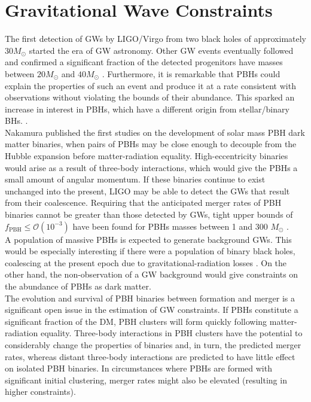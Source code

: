 \section{Gravitational Wave Constraints}
The first detection of GWs by LIGO/Virgo from two black holes of approximately $30 M_{\odot}$ started the era of GW astronomy. Other GW events eventually followed and confirmed a significant fraction of the detected progenitors have masses between $20 M_{\odot}$ and  $40 M_{\odot}$ \cite{LIGOScientific:2016sjg, LIGOScientific:2017bnn, LIGOScientific:2017vox}. Furthermore, it is remarkable that PBHs could explain the properties of such an event and produce it at a rate consistent with observations without violating the bounds of their abundance. This sparked an increase in interest in PBHs, which have a different origin from stellar/binary BHs. \cite{2016PhRvL.116t1301B}. \\
Nakamura \cite{Nakamura:1997sm} \cite{Ioka:1998nz} published the first studies on the development of solar mass PBH dark matter binaries, when pairs of PBHs may be close enough to decouple from the Hubble expansion before matter-radiation equality. High-eccentricity binaries would arise as a result of three-body interactions, which would give the PBHs a small amount of angular momentum. If these binaries continue to exist unchanged into the present, LIGO may be able to detect the GWs that result from their coalescence. Requiring that the anticipated merger rates of PBH binaries cannot be greater than those detected by GWs, tight upper bounds of $f_{\mathrm{PBH}} \leq \mathcal{O}(10^{-3})$ have been found for PBHs masses between 1 and 300 $M_{\odot}$ \cite{PhysRevD.98.023536}\cite{Sasaki_2018}\cite{PhysRevD.96.123523}. \\
A population of massive PBHs is expected to generate background GWs. This would be especially interesting if there were a population of binary black holes, coalescing at the present epoch due to gravitational-radiation losses \cite{Ioka:1998gf}. On the other hand, the non-observation of a GW background would give constraints on the abundance of PBHs as dark matter.\\

The evolution and survival of PBH binaries between formation and merger is a significant open issue in the estimation of GW constraints. If PBHs constitute a significant fraction of the DM, PBH clusters will form quickly following matter-radiation equality\cite{Chisholm:2005vm}.
Three-body interactions in PBH clusters have the potential to considerably change the properties of binaries and, in turn, the predicted merger rates\cite{Young:2020scc}, whereas distant three-body interactions are predicted to have little effect on isolated PBH binaries. In circumstances where PBHs are formed with significant initial clustering, merger rates might also be elevated (resulting in higher constraints).\\

